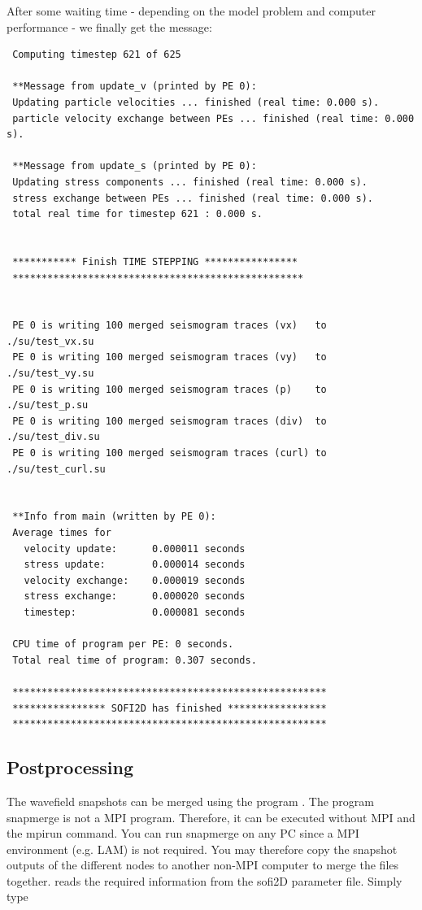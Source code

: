 \documentclass[11pt,onecolumn,oneside]{article}
\begin{document}
After some waiting time - depending on the model problem and computer performance - we finally get the message:

\begin{verbatim}
 Computing timestep 621 of 625

 **Message from update_v (printed by PE 0):
 Updating particle velocities ... finished (real time: 0.000 s).
 particle velocity exchange between PEs ... finished (real time: 0.000 s).

 **Message from update_s (printed by PE 0):
 Updating stress components ... finished (real time: 0.000 s).
 stress exchange between PEs ... finished (real time: 0.000 s).
 total real time for timestep 621 : 0.000 s.


 *********** Finish TIME STEPPING ****************
 **************************************************


 PE 0 is writing 100 merged seismogram traces (vx)   to  ./su/test_vx.su
 PE 0 is writing 100 merged seismogram traces (vy)   to  ./su/test_vy.su
 PE 0 is writing 100 merged seismogram traces (p)    to  ./su/test_p.su
 PE 0 is writing 100 merged seismogram traces (div)  to  ./su/test_div.su
 PE 0 is writing 100 merged seismogram traces (curl) to  ./su/test_curl.su


 **Info from main (written by PE 0):
 Average times for
   velocity update:      0.000011 seconds
   stress update:        0.000014 seconds
   velocity exchange:    0.000019 seconds
   stress exchange:      0.000020 seconds
   timestep:             0.000081 seconds

 CPU time of program per PE: 0 seconds.
 Total real time of program: 0.307 seconds.

 ******************************************************
 **************** SOFI2D has finished *****************
 ******************************************************
\end{verbatim}  

\subsection{Postprocessing}

The wavefield snapshots can be merged using the program . The program snapmerge is not a MPI program. Therefore, it can be executed without MPI and the mpirun command. You can run snapmerge on any PC since a MPI environment (e.g. LAM) is not required. You may therefore copy the snapshot outputs of the different nodes to another non-MPI computer to merge the files together.  reads the required information from the sofi2D parameter file. Simply type
\end{document}
